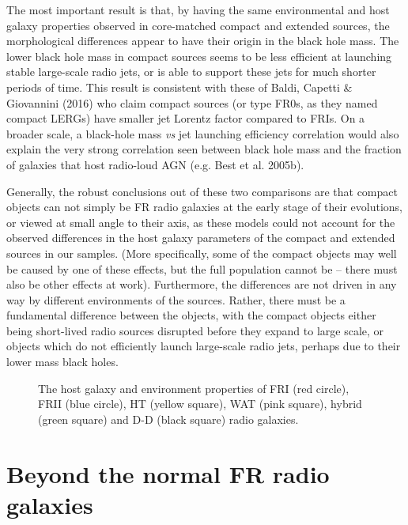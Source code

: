 \documentclass[usenatbib]{mn2e}
\begin{document}
The most important result is that, by having the same environmental and
host galaxy properties observed in core-matched compact and extended
sources, the morphological differences appear to have their origin in the
black hole mass. The lower black hole mass in compact sources seems to be
less efficient at launching stable large-scale radio jets, or is able to
support these jets for much shorter periods of time. This result is
consistent with these of Baldi, Capetti \& Giovannini (2016) who claim compact
sources (or type FR0s, as they named compact LERGs) have smaller jet
Lorentz factor compared to FRIs. On a broader scale, a black-hole mass {\it vs} 
jet launching efficiency correlation would also explain the very strong correlation seen
between black hole mass and the fraction of galaxies that host radio-loud AGN (e.g. Best et al. 2005b). 

Generally, the robust conclusions out of these two comparisons are that
compact objects can not simply be FR radio galaxies at the early stage of
their evolutions, or viewed at small angle to their axis, as these models 
could not account for the observed differences in the host galaxy parameters of the compact
and extended sources in our samples. (More specifically, some of the
compact objects may well be caused by one of these effects, but the full
population cannot be -- there must also be other effects at work).
Furthermore, the differences are not driven in any way by different
environments of the sources. Rather, there must be a fundamental
difference between the objects, with the compact objects either being
short-lived radio sources disrupted before they expand to large scale, or
objects which do not efficiently launch large-scale radio jets, perhaps
due to their lower mass black holes.

\begin{figure*}
\center
{}

\caption{The host galaxy and environment properties of FRI (red circle),
  FRII (blue circle), HT (yellow square), WAT (pink square), hybrid (green
  square) and D-D (black square) radio galaxies. }
\label{WAT}
\end{figure*}


\section{Beyond the normal FR radio galaxies}
\end{document}
